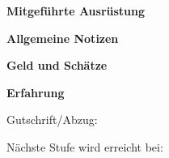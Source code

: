 \documentclass[a5paper,12pt]{article}
\begin{document}
\textbf{Mitgeführte Ausrüstung}

\textbf{Allgemeine Notizen}

\begin{minipage}{0.5\textwidth}

\textbf{Geld und Schätze}

\end{minipage}
\begin{minipage}{0.5\textwidth}

\textbf{Erfahrung}

\vspace{3cm}
Gutschrift/Abzug: \hrulefill

\vspace{1cm}
Nächste Stufe wird erreicht bei: \hrulefill

\end{minipage}
\end{document}
